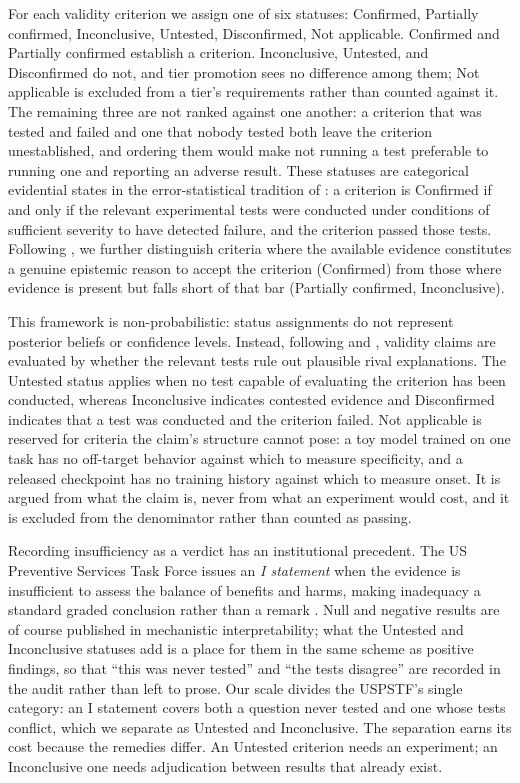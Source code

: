 \documentclass{article}
\begin{document}
For each validity criterion we assign one of six statuses: Confirmed, Partially confirmed, Inconclusive, Untested, Disconfirmed, Not applicable. Confirmed and Partially confirmed establish a criterion. Inconclusive, Untested, and Disconfirmed do not, and tier promotion sees no difference among them; Not applicable is excluded from a tier's requirements rather than counted against it. The remaining three are not ranked against one another: a criterion that was tested and failed and one that nobody tested both leave the criterion unestablished, and ordering them would make not running a test preferable to running one and reporting an adverse result. These statuses are categorical evidential states in the error-statistical tradition of \citet{mayo1996error, mayo2018statistical}: a criterion is Confirmed if and only if the relevant experimental tests were conducted under conditions of sufficient severity to have detected failure, and the criterion passed those tests. Following \citet{achinstein2001book}, we further distinguish criteria where the available evidence constitutes a genuine epistemic reason to accept the criterion (Confirmed) from those where evidence is present but falls short of that bar (Partially confirmed, Inconclusive).

This framework is non-probabilistic: status assignments do not represent posterior beliefs or confidence levels. Instead, following \citet{campbell1963experimental} and \citet{cook1979quasi}, validity claims are evaluated by whether the relevant tests rule out plausible rival explanations. The Untested status applies when no test capable of evaluating the criterion has been conducted, whereas Inconclusive indicates contested evidence and Disconfirmed indicates that a test was conducted and the criterion failed. Not applicable is reserved for criteria the claim’s structure cannot pose: a toy model trained on one task has no off-target behavior against which to measure specificity, and a released checkpoint has no training history against which to measure onset. It is argued from what the claim is, never from what an experiment would cost, and it is excluded from the denominator rather than counted as passing.

Recording insufficiency as a verdict has an institutional precedent. The US Preventive Services Task Force issues an \emph{I statement} when the evidence is insufficient to assess the balance of benefits and harms, making inadequacy a standard graded conclusion rather than a remark \citep{uspstf2021}. Null and negative results are of course published in mechanistic interpretability; what the Untested and Inconclusive statuses add is a place for them in the same scheme as positive findings, so that ``this was never tested'' and ``the tests disagree'' are recorded in the audit rather than left to prose. Our scale divides the USPSTF's single category: an I statement covers both a question never tested and one whose tests conflict, which we separate as Untested and Inconclusive. The separation earns its cost because the remedies differ. An Untested criterion needs an experiment; an Inconclusive one needs adjudication between results that already exist.
\end{document}
